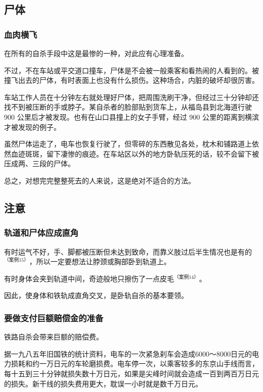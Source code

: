 \documentclass[UTF8]{ctexart}
\begin{document}
\subsection{尸体}

\subsubsection*{血肉横飞}

在所有的自杀手段中这是最惨的一种，对此应有心理准备。

不过，不在车站或平交道口撞车，尸体是不会被一般乘客和看热闹的人看到的。被撞飞出去的尸体，有时表面上也没有什么损伤。这种场合，内脏的破坏却很厉害。

车站工作人员在十分钟左右就处理好尸体，把周围洗刷干净，但经过三十分钟却还找不到被压断的手或脖子。某自杀者的脸部贴到货车上，从福岛县到北海道行驶 900 公里后才被发现。也有在山口县撞上的女子手臂，经过 900 公里的距离到横滨才被发现的例子。

虽然尸体运走了，电车也恢复行驶了，但零碎的东西散见各处，枕木和铺路道上依然血迹斑斑，留下凄惨的痕迹。在车站区以外的地方卧轨压死的话，较不会留下被压成两、三段的尸体。

总之，对想完完整整死去的人来说，这是绝对不适合的方法。

\subsection{注意}

\subsubsection*{轨道和尸体应成直角}

有时运气不好，手、脚都被压断但未达到致命，而靠义肢过后半生情况也是有的$^{（案例15）}$，所以一定要想法让脖颈或胸部卧到轨道上。

有时身体会夹到轨道中间，奇迹般地只擦伤了一点皮毛$^{（案例 14）}$。

因此，使身体和铁轨成直角交叉，是卧轨自杀的基本要领。 

\subsubsection*{要做支付巨额赔偿金的准备}

铁路自杀会带来巨额的赔偿费。

据一九八五年旧国铁的统计资料，电车的一次紧急刹车会造成6000～8000日元的电力损耗和约一万日元的车轮磨损费。电车停一次，以乘客较多的东京山手线而言，每十五到三十分钟就损失数十万日元，如果是尖峰时间就会造成一百到两百万日元的损失。新干线的损失费用更大，耽误一小时就是数千万日元。
\end{document}
